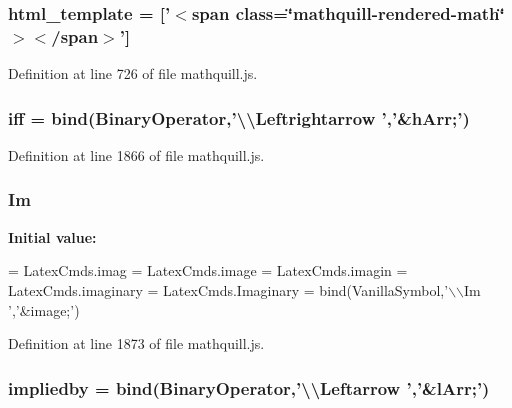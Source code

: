 \subsubsection[{html\-\_\-template}]{\setlength{\rightskip}{0pt plus 5cm}{\bf \-\_\-} html\-\_\-template = ['$<$span class=\char`\"{}mathquill-\/rendered-\/math\char`\"{}$>$$<$/span$>$']}\label{mathquill_8js_ac10dd745efd23d0896b4c6e85db20ab0}


Definition at line 726 of file mathquill.\-js.

\subsubsection[{iff}]{ iff = {\bf bind}({\bf Binary\-Operator},'\textbackslash{}\textbackslash{}Leftrightarrow ','\&{\bf h\-Arr};')}\label{mathquill_8js_a069b74b000ec02849faef4446ecb9b8e}


Definition at line 1866 of file mathquill.\-js.

\subsubsection[{Im}]{ Im}\label{mathquill_8js_acdf298c296cacbc8649268f60f29f50e}
{\bfseries Initial value\-:}
\begin{DoxyCode}
= LatexCmds.imag =
LatexCmds.image = LatexCmds.imagin = LatexCmds.imaginary = LatexCmds.Imaginary =
  bind(VanillaSymbol,\textcolor{stringliteral}{'\(\backslash\)\(\backslash\)Im '},\textcolor{stringliteral}{'&image;'})
\end{DoxyCode}


Definition at line 1873 of file mathquill.\-js.

\subsubsection[{impliedby}]{ impliedby = {\bf bind}({\bf Binary\-Operator},'\textbackslash{}\textbackslash{}Leftarrow ','\&{\bf l\-Arr};')}\label{mathquill_8js_af35848d687a8445719e70c90af2979b9}


